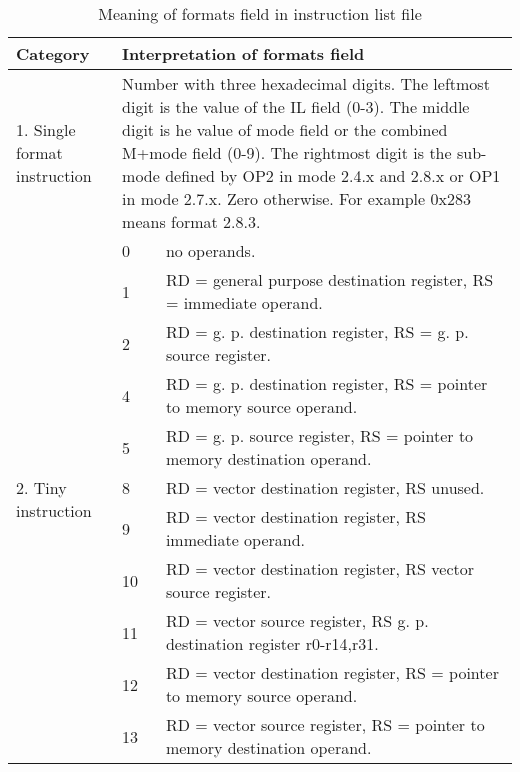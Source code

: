 \documentclass[forwardcom.tex]{subfiles}
\begin{document}
\pagebreak %
\label{table_format_field_in_list}
\begin{longtable} {|p{18mm}|p{14mm} p{80mm}|}
\caption{Meaning of formats field in instruction list file} 
\label{table:MeaningOfFormatsFieldInInstructionListFile}
\\
\endfirsthead
\endhead
\hline
\bfseries Category & \multicolumn{2}{|l|}{\bfseries Interpretation of formats field} \\
\hline
1.  Single format instruction & \multicolumn{2}{|p{102mm}|}{
Number with three hexadecimal digits. \newline
The leftmost digit is the value of the IL field (0-3). \newline
The middle digit is he value of mode field or the combined M+mode field (0-9).\newline
The rightmost digit is the sub-mode defined by OP2 in mode 2.4.x and 2.8.x or OP1 in mode 2.7.x. Zero otherwise. \newline
For example 0x283 means format 2.8.3.
}  \\
\hline
\multirow{11}{*}{\parbox{18mm}{2. Tiny instruction}} 
  &  0 & no operands. \\
  &  1 & RD = general purpose destination register, RS = immediate operand. \\
  &  2 & RD = g. p. destination register, RS = g. p. source register. \\
  &  4 & RD = g. p. destination register, RS = pointer to memory source operand. \\
  &  5 & RD = g. p. source register, RS = pointer to memory destination operand. \\
  &  8 & RD = vector destination register, RS unused. \\
  &  9 & RD = vector destination register, RS immediate operand. \\
  & 10 & RD = vector destination register, RS vector source register. \\
  & 11 & RD = vector source register, RS g. p. destination register r0-r14,r31. \\
  & 12 & RD = vector destination register, RS = pointer to memory source operand. \\
  & 13 & RD = vector source register, RS = pointer to memory destination operand. \\
\hline

\end{longtable}
\end{document}
